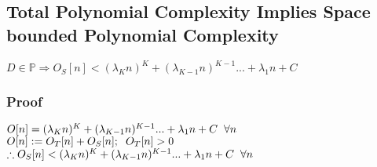 \documentclass[11pt]{article}
\begin{document}
\subsection{Total Polynomial Complexity Implies Space bounded Polynomial Complexity}
\begin{center}
\vspace{1mm}
$
D \in \mathbb{P} \Longrightarrow O_S[n] <  (\lambda_K n)^K + (\lambda_{K-1} n)^{K-1}... + \lambda_1 n + C
$
\end{center}

\subsubsection{Proof}
\begin{center}
$
O[n] = (\lambda_K n)^K + (\lambda_{K-1} n)^{K-1}... + \lambda_1 n + C \hspace{2mm} \forall n
$
\\ \vspace{2mm}
$
O[n] := O_T[n] + O_S[n]; \hspace{2mm} O_T[n] > 0
$
\\ \vspace{2mm}
$
\therefore O_S[n] < (\lambda_K n)^K + (\lambda_{K-1} n)^{K-1}... + \lambda_1 n + C \hspace{2mm} \forall n
$
\end{center}





























\newpage
\end{document}
